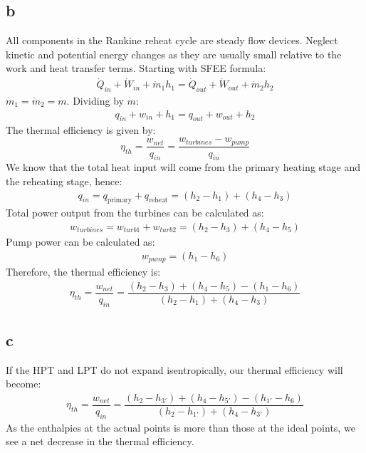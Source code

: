 \documentclass[11pt]{article}
\numberwithin{equation}{section}
\begin{document}
\subsection{b}
All components in the Rankine reheat cycle are steady flow devices. Neglect kinetic and potential energy changes as they are usually small relative to the work and heat transfer terms. Starting with SFEE formula:
\begin{align}
    \dot{Q}_{in} + \dot{W}_{in} + \dot{m}_1 h_1 = \dot{Q}_{out} + \dot{W}_{out} + \dot{m}_2 h_2
\end{align}
$\dot{m}_1 = \dot{m}_2 = \dot{m}$. Dividing by $\dot{m}$:
\begin{align}
    q_{in} + w_{in} + h_1 = q_{out} + w_{out} + h_2
\end{align}
The thermal efficiency is given by:
\begin{equation}
    \eta_{th} = \dfrac{w_{net}}{q_{in}} = \dfrac{w_{turbines} - w_{pump}}{q_{in}}
\end{equation}
We know that the total heat input will come from the primary heating stage and the reheating stage, hence:
\begin{align}
    q_{in} = q_{\textrm{primary}} + q_{\textrm{reheat}} = \left(h_2 - h_1\right) + \left(h_4 - h_3\right)
\end{align}
Total power output from the turbines can be calculated as:
\begin{align}
    w_{turbines} = w_{turb1} + w_{turb2} = \left(h_2 - h_3\right) + \left(h_4 - h_5\right)
\end{align}
Pump power can be calculated as:
\begin{align}
    w_{pump} = \left(h_1 - h_6\right)
\end{align}
Therefore, the thermal efficiency is:
\begin{align}
    \eta_{th} = \dfrac{w_{net}}{q_{in}} = \dfrac{\left(h_2 - h_3\right) + \left(h_4 - h_5\right) - \left(h_1 - h_6\right)}{\left(h_2 - h_1\right) + \left(h_4 - h_3\right)}
\end{align}
\subsection{c}
If the HPT and LPT do not expand isentropically, our thermal efficiency will become:
\begin{align}
    \eta_{th} = \dfrac{w_{net}}{q_{in}} = \dfrac{\left(h_2 - h_{3'}\right) + \left(h_4 - h_{5'}\right) - \left(h_{1'} - h_6\right)}{\left(h_2 - h_{1'}\right) + \left(h_4 - h_{3'}\right)}
\end{align}
As the enthalpies at the actual points is more than those at the ideal points, we see a net decrease in the thermal efficiency.
\end{document}
